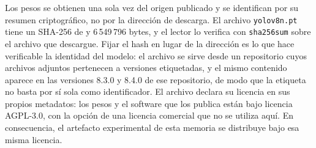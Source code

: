 Los pesos se obtienen una sola vez del origen publicado y se identifican por
su resumen criptográfico, no por la dirección de descarga. El archivo
\texttt{yolov8n.pt} tiene un SHA-256 de
\texttt{}
y 6\,549\,796 bytes, y el lector lo verifica con \texttt{sha256sum} sobre el
archivo que descargue. Fijar el hash en lugar de la dirección es lo que hace
verificable la identidad del modelo: el archivo se sirve desde un repositorio
cuyos archivos adjuntos pertenecen a versiones etiquetadas, y el mismo
contenido aparece en las versiones 8.3.0 y 8.4.0 de ese repositorio, de modo
que la etiqueta no basta por sí sola como identificador. El archivo declara
su licencia en sus propios metadatos: los pesos y el software que los publica
están bajo licencia AGPL-3.0, con la opción de una licencia comercial que no
se utiliza aquí. En consecuencia, el artefacto experimental de esta memoria
se distribuye bajo esa misma licencia.

